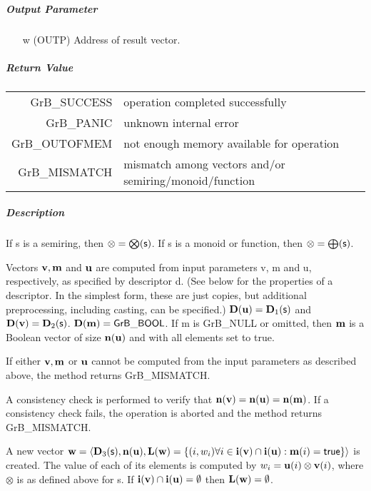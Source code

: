 \subparagraph{Output Parameter}

\begin{itemize}
	\item[{\sf w}] ({\sf OUTP}) Address of result vector.
\end{itemize}

\subparagraph{Return Value}

\begin{tabular}{rl} 
{\sf GrB\_SUCCESS} 	& operation completed successfully \\
{\sf GrB\_PANIC}	& unknown internal error \\
{\sf GrB\_OUTOFMEM}	& not enough memory available for operation \\
{\sf GrB\_MISMATCH}	& mismatch among vectors and/or semiring/monoid/function
\end{tabular}

\subparagraph{Description}

If {\sf s} is a semiring, then $\otimes = \bigotimes({\sf s})$. 
If {\sf s} is a monoid or function, then $\otimes = \bigoplus({\sf s})$.

Vectors ${\bf v}, {\bf m}$ and ${\bf u}$ are computed from
input parameters {\sf v}, {\sf m} and {\sf u}, respectively, as specified
by descriptor {\sf d}. (See below for the properties of a descriptor. In
the simplest form, these are just copies, but additional preprocessing,
including casting, can be specified.)  $\bold{D}({\bf u}) =
\bold{D}_1({\sf s})$ and $\bold{D}({\bf v}) = \bold{D}_2({\sf s})$.
$\bold{D}({\bf m}) = {\sf GrB\_BOOL}$.  If {\sf m} is {\sf GrB\_NULL} or omitted,
then ${\bf m}$ is a Boolean vector of size $\bold{n}({\bf u})$
and with all elements set to {\sf true}.

If either ${\bf v}, {\bf m}$ or ${\bf u}$ cannot be computed
from the input parameters as described above, the method returns {\sf
GrB\_MISMATCH}.

A consistency check is performed to verify that $\bold{n}({\bf v})
= \bold{n}({\bf u}) = \bold{n}({\bf m})$. If a consistency
check fails, the operation is aborted and the method returns {\sf
GrB\_MISMATCH}.

A new vector ${\bf w} = \langle \bold{D}_3({\sf s}),
\bold{n}({\bf u}), \bold{L}({\bf w}) = \{(i,w_i)  \forall i \in
{\bf i}({\bf v}) \cap {\bf i}({\bf u}) : {\bf m}(i)
= {\sf true} \} \rangle$ is created.  The value of each of its
elements is computed by $w_i = {\bf u}(i) \otimes {\bf v}(i)$,
where $\otimes$ is as defined above for {\sf s}.
If ${\bf i}({\bf v}) \cap {\bf i}({\bf u}) = \emptyset$
then $\bold{L}({\bf w}) = \emptyset$.

